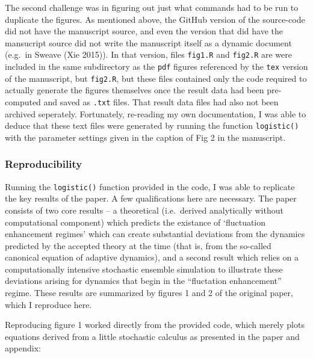 \documentclass[
]{rescience}
\begin{document}
The second challenge was in figuring out just what commands had to be
run to duplicate the figures. As mentioned above, the GitHub version of
the source-code did not have the manuscript source, and even the version
that did have the mansucript source did not write the manuscript itself
as a dynamic document (e.g.~in Sweave (Xie 2015)). In that version,
files \texttt{fig1.R} and \texttt{fig2.R} are were included in the same
subdirectory as the \texttt{pdf} figures referenced by the \texttt{tex}
version of the manuscript, but \texttt{fig2.R}, but these files
contained only the code required to actually generate the figures
themselves once the result data had been pre-computed and saved as
\texttt{.txt} files. That result data files had also not been archived
seperately. Fortunately, re-reading my own documentation, I was able to
deduce that these text files were generated by running the function
\texttt{logistic()} with the parameter settings given in the caption of
Fig 2 in the manuscript.

\hypertarget{reproducibility}{%
\subsubsection{Reproducibility}\label{reproducibility}}

Running the \texttt{logistic()} function provided in the code, I was
able to replicate the key results of the paper. A few qualifications
here are necessary. The paper consists of two core results -- a
theoretical (i.e.~derived analytically without computational component)
which predicts the existance of `fluctuation enhancement regimes' which
can create substantial deviations from the dynamics predicted by the
accepted theory at the time (that is, from the so-called canonical
equation of adaptive dynamics), and a second result which relies on a
computationally intensive stochastic ensemble simulation to illustrate
these deviations arising for dynamics that begin in the ``fluctation
enhancement'' regime. These results are summarized by figures 1 and 2 of
the original paper, which I reproduce here.

Reproducing figure 1 worked directly from the provided code, which
merely plots equations derived from a little stochastic calculus as
presented in the paper and appendix:
\end{document}
